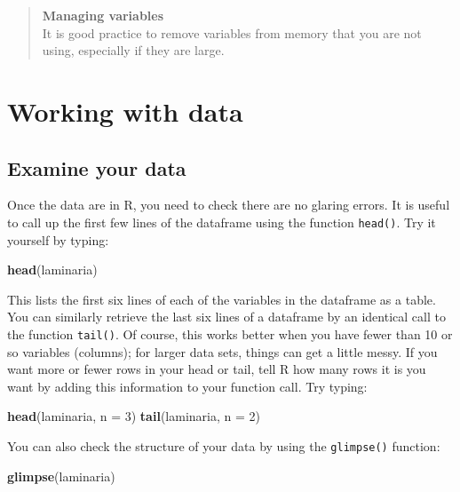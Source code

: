 \documentclass[
]{book}
\newenvironment{Shaded}{\begin{snugshade}}{\end{snugshade}}
\newcommand{\DataTypeTok}[1]{\textcolor[rgb]{0.13,0.29,0.53}{#1}}
\newcommand{\DecValTok}[1]{\textcolor[rgb]{0.00,0.00,0.81}{#1}}
\newcommand{\KeywordTok}[1]{\textcolor[rgb]{0.13,0.29,0.53}{\textbf{#1}}}
\newcommand{\NormalTok}[1]{#1}
\begin{document}
\begin{quote}
\textbf{Managing variables}\\
It is good practice to remove variables from memory that you are not using, especially if they are large.
\end{quote}

\hypertarget{working-with-data}{%
\section{Working with data}\label{working-with-data}}

\hypertarget{examine-your-data}{%
\subsection{Examine your data}\label{examine-your-data}}

Once the data are in R, you need to check there are no glaring errors. It is useful to call up the first few lines of the dataframe using the function \texttt{head()}. Try it yourself by typing:

\begin{Shaded}
\begin{Highlighting}[]
\KeywordTok{head}\NormalTok{(laminaria)}
\end{Highlighting}
\end{Shaded}

This lists the first six lines of each of the variables in the dataframe as a table. You can similarly retrieve the last six lines of a dataframe by an identical call to the function \texttt{tail()}. Of course, this works better when you have fewer than 10 or so variables (columns); for larger data sets, things can get a little messy. If you want more or fewer rows in your head or tail, tell R how many rows it is you want by adding this information to your function call. Try typing:

\begin{Shaded}
\begin{Highlighting}[]
\KeywordTok{head}\NormalTok{(laminaria, }\DataTypeTok{n =} \DecValTok{3}\NormalTok{)}
\KeywordTok{tail}\NormalTok{(laminaria, }\DataTypeTok{n =} \DecValTok{2}\NormalTok{)}
\end{Highlighting}
\end{Shaded}

You can also check the structure of your data by using the \texttt{glimpse()} function:

\begin{Shaded}
\begin{Highlighting}[]
\KeywordTok{glimpse}\NormalTok{(laminaria)}
\end{Highlighting}
\end{Shaded}
\end{document}
